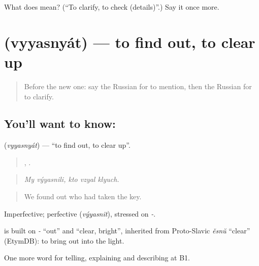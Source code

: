 \begin{tcolorbox}[breakable,colback=teal!4,colframe=teal!35!black,title={Before you move on}]
What does  mean? (\textquotedblleft{}To clarify, to check (details)\textquotedblright{}.) Say it once more.
\end{tcolorbox}
\section[\texorpdfstring{\ru{выяснять} (vyyasnyát)}{выяснять (vyyasnyát)}]{ (vyyasnyát) — to find out, to clear up}

\label{lesson:RU-C283-vyyasnyat}



\begin{quote}
Before the new one: say the Russian for to mention, then the Russian for to clarify.
\end{quote}

\subsection*{You'll want to know: }
\textbf{} (\emph{vyyasnyát}) — \textquotedblleft{}to find out, to clear up\textquotedblright{}.

\begin{quote}
 ,   .
\end{quote}

\begin{quote}
\emph{My výyasnili, kto vzyal klyuch.}
\end{quote}

\begin{quote}
We found out who had taken the key.
\end{quote}

Imperfective; perfective \emph{} (\emph{výyasnit}), stressed on \emph{-}.

\begin{cousinweb}
\emph{} is built on \emph{-} \textquotedblleft{}out\textquotedblright{} and \emph{} \textquotedblleft{}clear, bright\textquotedblright{}, inherited from Proto-Slavic \emph{ěsnŭ} \textquotedblleft{}clear\textquotedblright{} (EtymDB): to bring out into the light.
\end{cousinweb}

\begin{grammarlens}[title={What you've built}]
One more word for telling, explaining and describing at B1.
\end{grammarlens}

